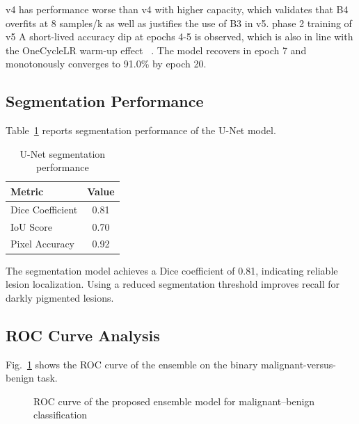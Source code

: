 \documentclass[conference]{IEEEtran}
\begin{document}
v4 has performance worse than v4 with higher capacity, which validates that B4 overfits at 8 samples/k as well as justifies the use of B3 in v5. phase 2 training of v5 A short-lived accuracy dip at epochs 4-5 is observed, which is also in line with the OneCycleLR warm-up effect ~\cite{smith2019superconvergence}. The model recovers in epoch 7 and monotonously converges to 91.0\% by epoch 20.

\subsection{Segmentation Performance}

Table~\ref{tab:segmentation_results} reports segmentation performance of the U-Net model.

\begin{table}[h]
\centering
\caption{U-Net segmentation performance}
\label{tab:segmentation_results}
\begin{tabular}{lc}
\hline
Metric & Value \\
\hline
Dice Coefficient & 0.81 \\
IoU Score & 0.70 \\
Pixel Accuracy & 0.92 \\
\hline
\end{tabular}
\end{table}

The segmentation model achieves a Dice coefficient of 0.81, indicating reliable lesion localization. Using a reduced segmentation threshold improves recall for darkly pigmented lesions.





\subsection{ROC Curve Analysis}

Fig.~\ref{fig:roc_curve} shows the ROC curve of the ensemble on the binary malignant-versus-benign task.

\begin{figure}[h]
\centering
{}

\caption{ROC curve of the proposed ensemble model for malignant–benign classification}
\label{fig:roc_curve}
\end{figure}
\end{document}
